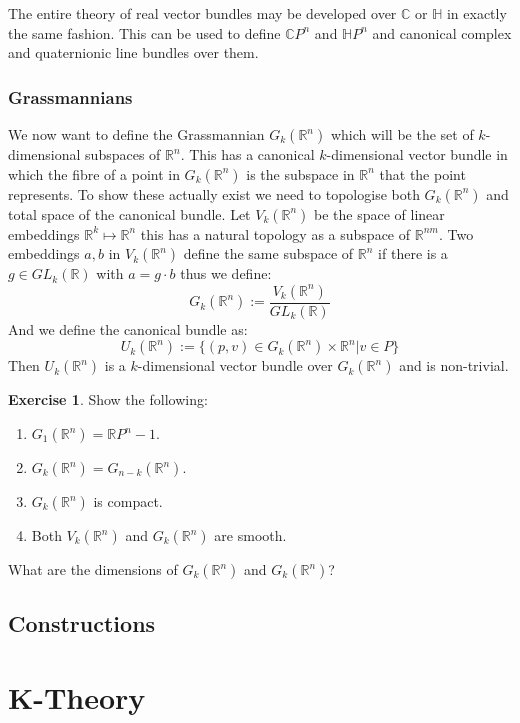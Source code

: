 \documentclass[a4paper,10pt]{article}
\theoremstyle{plain}%
\theoremstyle{definition}
\newtheorem{exer}{Exercise}
\theoremstyle{remark}
\newcommand{\RR}{\mathbb{R}}
\newcommand{\CC}{\mathbb{C}}
\newcommand{\HH}{\mathbb{H}}
\begin{document}
The entire theory of real vector bundles may be developed over $\CC$ or $\HH$ in exactly the same fashion. This can
be used to define $\CC P^n$ and $\HH P^n$ and canonical complex and quaternionic line bundles over them.

\subsubsection{Grassmannians}

We now want to define the Grassmannian $G_k(\RR^n)$ which will be the set of $k$-dimensional subspaces of $\RR^n$.
This has a canonical $k$-dimensional vector bundle in which the fibre of a point in $G_k(\RR^n)$ is the subspace 
in $\RR^n$ that the point represents. 
To show these actually exist we need to topologise both $G_k(\RR^n)$ and total space of the canonical bundle.
Let $V_k(\RR^n)$ be the space of linear embeddings $\RR^k\mapsto \RR^n$ this has a natural topology as a subspace of
$\RR^{n m}$. Two embeddings $a,b$ in $V_k(\RR^n)$ define the same subspace of $\RR^n$ if there is a $g\in GL_k(\RR)$
with $a=g\cdot b$ thus we define:
$$G_k(\RR^n):=\frac{V_k(\RR^n)}{GL_k(\RR)}$$
And we define the canonical bundle as:
$$U_k(\RR^n):=\{(p,v)\in G_k(\RR^n)\times \RR^n | v\in P\}$$
Then $U_k(\RR^n)$ is a $k$-dimensional vector bundle over $G_k(\RR^n)$ and is non-trivial.

\begin{exer}
Show the following:
 \begin{enumerate}
  \item $G_1(\RR^n)=\RR P^n-1$.
  \item $G_k(\RR^n) = G_{n-k}(\RR^n)$.
  \item $G_k(\RR^n)$ is compact.
  \item Both $V_k(\RR^n)$ and $G_k(\RR^n)$ are smooth.
 \end{enumerate}
What are the dimensions of $G_k(\RR^n)$ and $G_k(\RR^n)$?
\end{exer}

\subsection{Constructions}

\section{K-Theory}
\end{document}
